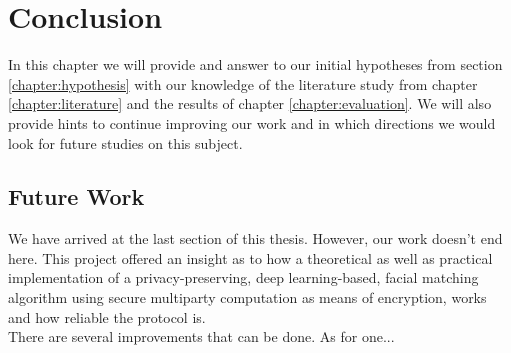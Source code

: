 \chapter{Conclusion}
In this chapter we will provide and answer to our initial hypotheses from section \ref{chapter:hypothesis} with our knowledge of the literature study from chapter \ref{chapter:literature} and the results of chapter \ref{chapter:evaluation}. We will also provide hints to continue improving our work and in which directions we would look for future studies on this subject.

\section{Future Work}
We have arrived at the last section of this thesis. However, our work doesn't end here. This project offered an insight as to how a theoretical as well as practical implementation of a privacy-preserving, deep learning-based, facial matching algorithm using secure multiparty computation as means of encryption, works and how reliable the protocol is.\\

There are several improvements that can be done. As for one...

